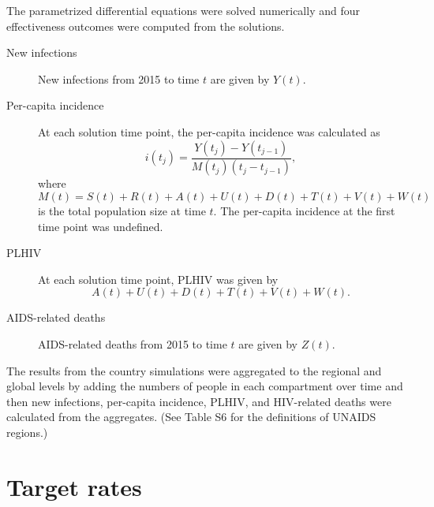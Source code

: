 \documentclass{article}
\begin{document}
The parametrized differential equations were solved numerically
\cite[see][]{medlock2016-git} and four effectiveness outcomes were
computed from the solutions.
\begin{description}
\item[New infections] New infections from 2015 to time $t$ are given
  by $Y(t)$.

\item[Per-capita incidence] At each solution time point, the
  per-capita incidence was calculated as
  \begin{equation}
    i(t_j) = \frac{Y(t_j) - Y(t_{j - 1})}{M(t_j) (t_j - t_{j - 1})},
  \end{equation}
  where
  \begin{equation}
    M(t) = S(t) + R(t) + A(t) + U(t) + D(t) + T(t) + V(t) + W(t)
  \end{equation}
  is the total population size at time $t$.  The per-capita incidence
  at the first time point was undefined.

\item[PLHIV] At each solution time point, PLHIV was given by
  \begin{equation}
    A(t) + U(t) + D(t) + T(t) + V(t) + W(t).
  \end{equation}

\item[AIDS-related deaths] AIDS-related deaths from 2015 to time $t$
  are given by $Z(t)$.

\end{description}

The results from the country simulations were aggregated to the
regional and global levels by adding the numbers of people in each
compartment over time and then new infections, per-capita incidence,
PLHIV, and HIV-related deaths were calculated from the aggregates.
(See Table S6 for the definitions of UNAIDS regions.)


\section{Target rates}
\label{targets}
\end{document}
